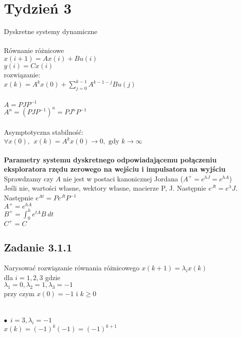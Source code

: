 \pagebreak
\section*{Tydzień 3}
Dyskretne systemy dynamiczne\\
\\
Równanie różnicowe\\
$x(i+1)=Ax(i)+Bu(i)$\\
$y(i)=Cx(i)$\\
rozwiązanie:\\
$x(k)=A^kx(0)+\sum^{k-1}_{j=0}A^{k-1-j}Bu(j)$\\
\\
$A=PJP^{-1}$\\
$A^n=(PJP^{-1})^n=PJ^nP^{-1}$\\
\\
Asymptotyczna stabilność:\\
$\forall x(0), \ \ x(k)=A^kx(0)\rightarrow0, \text{ gdy } k\rightarrow \infty$\\
\\
\textbf{Parametry systemu dyskretnego odpowiadającemu połączeniu eksploratora rzędu zerowego na wejściu i impulsatora na wyjściu}\\
Sprawdzamy czy $A$ nie jest w postaci kanonicznej Jordana ($A^+=e^{hJ}=e^{hA}$)\\
Jeśli nie, wartości własne, wektory własne, macierze P, J. Następnie $e^{Jt}=e^{\lambda}J$. Następnie $e^{At}=Pe^{Jt}P^{-1}$\\
$A^+=e^{hA}$\\
$B^+=\int^h_0e^{tA}B \ dt$\\
$C^+=C$\\


\pagebreak
\subsection*{Zadanie 3.1.1} {\color{darkgray}
	Narysować rozwiązanie równania różnicowego $x(k+1)=\lambda_ix(k)$\\
	 dla $i=1,2,3$ gdzie \\
	$\lambda_1 = 0, \lambda_2=1, \lambda_3=-1$ \\
	przy czym $x(0)=-1$ i $k\geq0$\\
}\lineh
\\\\
\noindent$\bullet\ \ i=3, \lambda_i = -1$\\
$x(k)=(-1)^k(-1)=(-1)^{k+1}$

